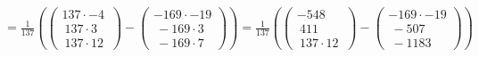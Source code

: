 \documentclass[12pt,a4paper]{article}
\begin{document}
\\
$=\frac{1}{137}(\left( \begin{array}{c} 137\cdot -4 \\\ 137\cdot 3 \\\ 137\cdot 12 \ \end{array}\right)-\left( \begin{array}{c} -169\cdot -19 \\\ -169\cdot 3 \\\ -169\cdot 7 \ \end{array}\right))= \frac{1}{137}(\left( \begin{array}{c} -548 \\\ 411 \\\ 137\cdot 12 \ \end{array}\right)-\left( \begin{array}{c} -169\cdot -19 \\\ -507 \\\ -1183 \ \end{array}\right))$\\
\end{document}
